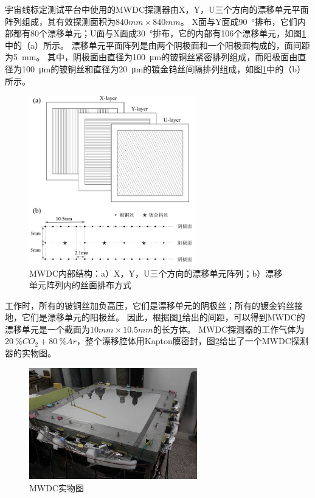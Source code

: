 宇宙线标定测试平台中使用的MWDC探测器由X，Y，U三个方向的漂移单元平面阵列组成，其有效探测面积为$840mm \times 840mm$。
X面与Y面成\SI{90}{\degree}排布，它们内部都有80个漂移单元；U面与X面成\SI{30}{\degree}排布，它的内部有106个漂移单元，如图\ref{fig:cosmic_ray:mwdc_schematic}中的（a）所示。
漂移单元平面阵列是由两个阴极面和一个阳极面构成的，面间距为\SI{5}{mm}。
其中，阴极面由直径为\SI{100}{\micro\meter}的铍铜丝紧密排列组成，而阳极面由直径为\SI{100}{\micro\meter}的铍铜丝和直径为\SI{20}{\micro\meter}的镀金钨丝间隔排列组成，如图\ref{fig:cosmic_ray:mwdc_schematic}中的（b）所示。
\begin{figure}[htb]
\centering
\includegraphics[width=0.65\textwidth]{chap/cosmic_ray/fig/mwdc_schematic.png}
\caption{MWDC内部结构：a）X，Y，U三个方向的漂移单元阵列；b）漂移单元阵列内的丝面排布方式}
\label{fig:cosmic_ray:mwdc_schematic}
\end{figure}
工作时，所有的铍铜丝加负高压，它们是漂移单元的阴极丝；所有的镀金钨丝接地，它们是漂移单元的阳极丝。
因此，根据图\ref{fig:cosmic_ray:mwdc_schematic}给出的间距，可以得到MWDC的漂移单元是一个截面为$10mm\times 10.5mm$的长方体。
MWDC探测器的工作气体为$\SI{20}{\percent}CO_2 + \SI{80}{\percent}Ar$，整个漂移腔体用Kapton膜密封，图\ref{fig:cosmic_ray:mwdc}给出了一个MWDC探测器的实物图。
\begin{figure}[htbp]
	\centering
	\includegraphics[width=0.65\textwidth]{chap/cosmic_ray/fig/mwdc.jpg}
	\caption{MWDC实物图}
	\label{fig:cosmic_ray:mwdc}
\end{figure}

